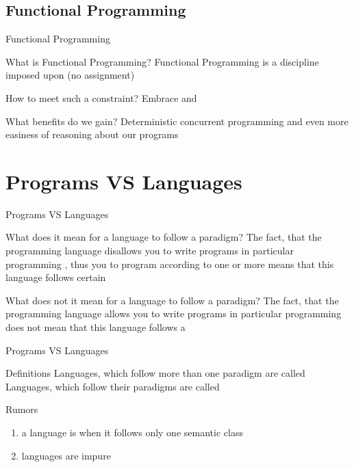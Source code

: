\subsection{Functional Programming}
\begin{frame}{Functional Programming}
\begin{block}{What is Functional Programming?}
Functional Programming is a discipline imposed upon  (no
assignment)
\end{block}
\pause
\begin{block}{How to meet such a constraint?}
Embrace  and 
\end{block}
\pause
\begin{block}{What benefits do we gain?}
Deterministic concurrent programming and even more easiness of
reasoning about our programs
\end{block}
\end{frame}

\section{Programs VS Languages}
\begin{frame}{Programs VS Languages}
\begin{block}{What does it mean for a language to follow a paradigm?}
The fact, that the programming language \alert{disallows} you to write programs
in particular programming , thus  you to
program according to one or more  means that this
language follows certain 
\end{block}
\pause
\begin{alertblock}{What does not it mean for a language to follow a paradigm?}
The fact, that the programming language allows you to write programs in
particular programming  does not mean that this language
follows a 
\end{alertblock}
\end{frame}

\begin{frame}{Programs VS Languages}
\begin{block}{Definitions}
Languages, which follow more than one paradigm are called \\
Languages, which follow their paradigms  are called
\\
\end{block}
\pause
\begin{alertblock}{Rumors}
\begin{enumerate}
\item a language is  when it follows \alert{only one} semantic
class
\item {} languages are \alert{impure}
\end{enumerate}
\end{alertblock}
\end{frame}

